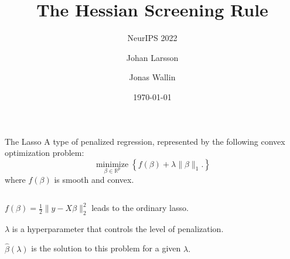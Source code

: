 \documentclass[10pt,ignorenonframetext]{beamer}
\title{The Hessian Screening Rule}
\subtitle{NeurIPS 2022}
\author[shortname]{\texorpdfstring{\alert{Johan Larsson}}{Johan Larsson} \and Jonas Wallin}
\institute{Department of Statistics, Lund University}
\date{\today}
\begin{document}


\begin{frame}{The Lasso}
  A type of penalized regression, represented by the following
  convex optimization problem:
  \[
    \operatorname*{minimize}_{\beta \in \mathbb{R}^p}
    \left\{
      f(\beta) + \lambda \lVert \beta \rVert_1.
    \right\}
  \]
  where \(f(\beta)\) is smooth and convex. \medskip

  \begin{columns}[T]
    \begin{column}{0.45\linewidth}
      \(f(\beta) = \frac 1 2 \lVert y - X\beta\rVert_2^2\)
      leads to the ordinary lasso. \medskip

      \(\lambda\) is a hyperparameter that controls the level of
      \alert{penalization}. \medskip

      \(\hat\beta(\lambda)\) is the solution to this problem for a given
      \(\lambda.\)

    \end{column}
    \begin{column}{0.45\linewidth}
      \begin{figure}
        \centering
        \pgfplotsset{width=6cm,height=6cm}
        
      \end{figure}
    \end{column}
  \end{columns}
\end{frame}
\end{document}
